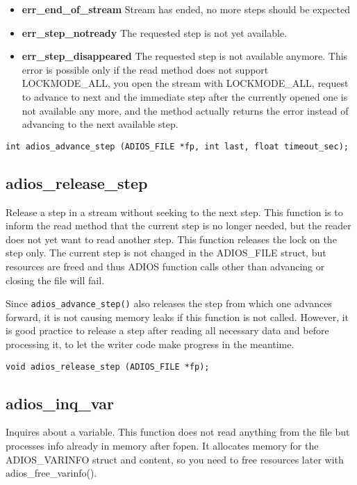 \begin{itemize}
\item{\bf err\_end\_of\_stream}    Stream has ended, no more steps should be expected

\item{\bf err\_step\_notready}    The requested step is not yet available.

\item{\bf err\_step\_disappeared} The requested step is not available anymore. This error is possible only if the read method does not support LOCKMODE\_ALL, you open the stream with LOCKMODE\_ALL, request to advance to next and the immediate step after the currently opened one is not available any more, and the method actually returns the error instead of advancing to the next available step. 
\end{itemize}


\begin{lstlisting}[alsolanguage=C]
int adios_advance_step (ADIOS_FILE *fp, int last, float timeout_sec); 
\end{lstlisting}

\subsection{adios\_release\_step}
Release a step in a stream without seeking to the next step.
This function is to inform the read method that the current step is
no longer needed, but the reader does not yet want to read another step.
This function releases the lock on the step only. The current step is not
changed in the ADIOS\_FILE struct, but resources are freed and thus ADIOS function calls other than advancing or closing the file will fail. 

Since \verb+adios_advance_step()+ also releases the step from which one advances 
forward, it is not causing memory leaks if this function is not called. However, it is good practice to release a step after reading all necessary data and before processing it, to let the writer code make progress in the meantime.

\begin{lstlisting}[alsolanguage=C]
void adios_release_step (ADIOS_FILE *fp);
\end{lstlisting}

\subsection{adios\_inq\_var}
\label{section:read_api_adios_inq_var}
Inquires about a variable.
This function does not read anything from the file but processes info
already in memory after fopen.
It allocates memory for the ADIOS\_VARINFO struct and content, so
you need to free resources later with adios\_free\_varinfo().

